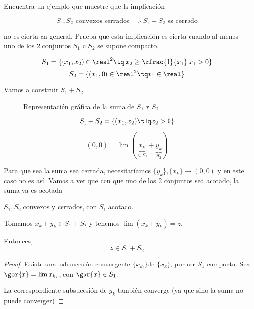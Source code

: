 \begin{problem}[9]

Encuentra un ejemplo que muestre que la implicación

\[S_1,S_2 \text{ convexos cerrados} \implies S_1+S_2\text{ es cerrado}\]

no es cierta en general.
%
Prueba que esta implicación es cierta cuando al menos uno de los 2 conjuntos $S_1$ o $S_2$ se supone compacto.

\solution

\[S_1 = \{ (x_1,x_2) \in \real^2\tq\; x_2\geq \rfrac{1}{x_1} \;x_1 > 0\}\]
\[S_2 = \{(x_1,0) \in \real^2\tq x_1\in\real\}\]

Vamos a construir $S_1 + S_2$


\begin{figure}[hbtp]
\centering
{}
\caption{Representación gráfica de la suma de $S_1$ y $S_2$}
\end{figure}


\[S_1 + S_2  = \{(x_1,x_2)\tlq x_2>0\}\]

\[(0,0) = \lim (\underbrace{x_k}_{\in S_1} + \underbrace{y_k}_{S_2})\]

Para que sea la suma sea cerrada, necesitaríamos $\{y_k\},\{x_k\} \to (0,0)$ y en este caso no es así.
%
Vamos a ver que con que uno de los 2 conjuntos sea acotado, la suma ya es acotada.

\begin{prop}

$S_1,S_2$ convexos y cerrados, con $S_1$ acotado.

Tomamos $x_k + y_k \in S_1 + S_2$ y tenemos $\lim(x_k + y_k) = z$.

Entonces,
\[z\in S_1 + S_2\]
\end{prop}
\begin{proof}
Existe una subsucesión convergente $\{x_{k_i}\}$de $\{x_k\}$, por ser $S_1$ compacto.
Sea $\gor{x} = \lim x_{k_i}$, con $\gor{x}\in S_1$.

La correspondiente subsucesión de $y_k$ también converge (ya que sino la suma no puede converger)

\end{proof}

\end{problem}

